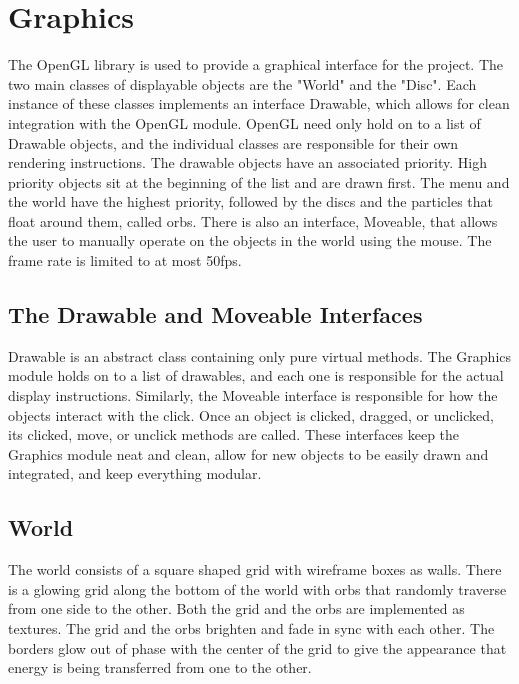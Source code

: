 \documentclass[pdftext,twoside,10pt]{article}
\begin{document}
\vspace{1cm}

\section{Graphics}
The OpenGL library is used to provide a graphical interface for the project. The two main classes of displayable objects are the "World" and the "Disc". Each instance of these classes implements an interface Drawable, which allows for clean integration with the OpenGL module. OpenGL need only hold on to a list of Drawable objects, and the individual classes are responsible for their own rendering instructions. The drawable objects have an associated priority. High priority objects sit at the beginning of the list and are drawn first. The menu and the world have the highest priority, followed by the discs and the particles that float around them, called orbs. There is also an interface, Moveable, that allows the user to manually operate on the objects in the world using the mouse. The frame rate is limited to at most 50fps.

\subsection{The Drawable and Moveable Interfaces}
Drawable is an abstract class containing only pure virtual methods. The Graphics module holds on to a list of drawables, and each one is responsible for the actual display instructions. Similarly, the Moveable interface is responsible for how the objects interact with the click. Once an object is clicked, dragged, or unclicked, its clicked, move, or unclick methods are called. These interfaces keep the Graphics module neat and clean, allow for new objects to be easily drawn and integrated, and keep everything modular.

\subsection{World}
The world consists of a square shaped grid with wireframe boxes as walls. There is a glowing grid along the bottom of the world with orbs that randomly traverse from one side to the other. Both the grid and the orbs are implemented as textures. The grid and the orbs brighten and fade in sync with each other. The borders glow out of phase with the center of the grid to give the appearance that energy is being transferred from one to the other.
\end{document}
